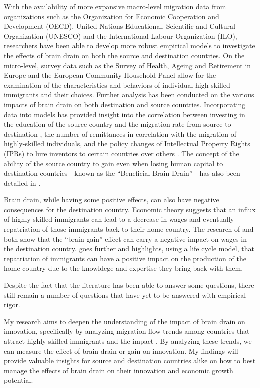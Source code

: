 \documentclass[12pt]{article}
\begin{document}
With the availability of more expansive macro-level migration data from organizations such as the Organization for Economic Cooperation and Development (OECD), United Nations Educational, Scientific and Cultural Organization (UNESCO) and the International Labour Organization (ILO), researchers have been able to develop more robust empirical models to investigate the effects of brain drain on both the source and destination countries.
On the micro-level, survey data such as the Survey of Health, Ageing and Retirement in Europe and the European Community Household Panel allow for the examination of the characteristics and behaviors of individual high-skilled immigrants and their choices.
Further analysis has been conducted on the various impacts of brain drain on both destination and source countries.
Incorporating data into models has provided insight into the correlation between investing in the education of the source country and the migration rate from source to destination \autocite{beine_brain_2001}, the number of remittances in correlation with the migration of highly-skilled individuals, and the policy changes of Intellectual Property Rights (IPRs) to lure inventors to certain countries over others \autocite{mcausland_bidding_2011}.
The concept of the ability of the source country to gain even when losing human capital to destination countries—known as the ``Beneficial Brain Drain''—has also been detailed in \cite{kuhn_international_2006}.

Brain drain, while having some positive effects, can also have negative consequences for the destination country.
Economic theory suggests that an influx of highly-skilled immigrants can lead to a decrease in wages and eventually repatriation of those immigrants back to their home country.
The research of \cite{chiswick_high_2005} and \cite{hussain_reversing_2015} both show that the ``brain gain'' effect can carry a negative impact on wages in the destination country.
\cite{hussain_reversing_2015} goes further and highlights, using a life cycle model, that repatriation of immigrants can have a positive impact on the production of the home country due to the knowldege and expertise they bring back with them.

Despite the fact that the literature has been able to answer some questions, there still remain a number of questions that have yet to be answered with empirical rigor.

My research aims to deepen the understanding of the impact of brain drain on innovation, specifically by analyzing migration flow trends among countries that attract highly-skilled immigrants and the impact .
By analyzing these trends, we can measure the effect of brain drain or gain on innovation.
My findings will provide valuable insights for source and destination countries alike on how to best manage the effects of brain drain on their innovation and economic growth potential.
\end{document}
